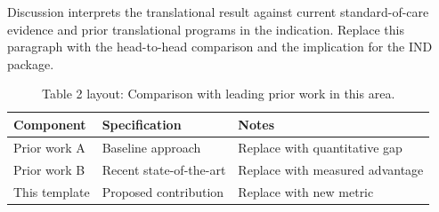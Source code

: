 
Discussion interprets the translational result against current standard-of-care evidence and prior translational programs in the indication. Replace this paragraph with the head-to-head comparison and the implication for the IND package.

\begin{table}[H]
\caption{Table 2 layout: Comparison with leading prior work in this area.}
\label{tab:discussion_compare}
\centering
\begin{tabular}{>{\raggedright\arraybackslash}p{3.4cm} >{\raggedright\arraybackslash}p{4.6cm} >{\raggedright\arraybackslash}p{5.4cm}}
\toprule
\textbf{Component} & \textbf{Specification} & \textbf{Notes} \\
\midrule
  Prior work A & Baseline approach & Replace with quantitative gap \\
  Prior work B & Recent state-of-the-art & Replace with measured advantage \\
  This template & Proposed contribution & Replace with new metric \\
\bottomrule
\end{tabular}
\end{table}

